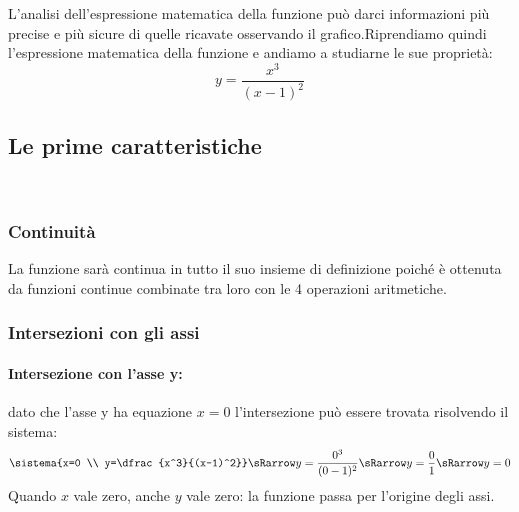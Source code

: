 L'analisi dell'espressione matematica della funzione può darci informazioni 
più precise e più sicure di quelle ricavate osservando il grafico.Riprendiamo 
quindi l'espressione matematica della funzione e andiamo a studiarne le sue 
proprietà:
\[y=\frac{x^3}{(x-1)^2}\]


\subsection{Le prime caratteristiche}
\label{subsec:prime_caratteristiche}
\mbox{ }


\subsubsection{Continuità}
La funzione sarà continua in tutto il suo insieme di definizione poiché è 
ottenuta da funzioni continue combinate tra loro con le 4 operazioni 
aritmetiche.

\subsubsection{Intersezioni con gli assi}

\paragraph{Intersezione con l'asse y:}
dato che l'asse y ha equazione \(x=0\) l'intersezione può essere trovata 
risolvendo il sistema:
\[\sistema{x=0 \\ y=\dfrac{x^3}{(x-1)^2}} \sRarrow 
           y=\dfrac{0^3}{(0-1)^2} \sRarrow 
           y=\dfrac{0}{1} \sRarrow y=0\]
Quando \(x\) vale zero, anche \(y\) vale zero: la funzione passa per 
l'origine degli assi.

